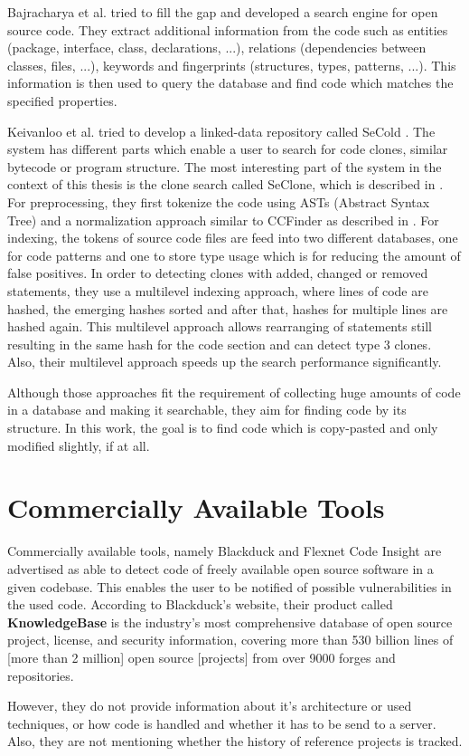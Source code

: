 Bajracharya et al. tried to fill the gap and developed a search engine for open source code.
They extract additional information from the code such as entities (package, interface, class, declarations, ...), relations (dependencies between classes, files, ...), keywords and fingerprints (structures, types, patterns, ...).
This information is then used to query the database and find code which matches the specified properties.

Keivanloo et al. tried to develop a linked-data repository called SeCold \cite{keivanloo2012leveraging,keivanloo2011internet,keivanloo2011seclone,keivanloo2010semantic}.
The system has different parts which enable a user to search for code clones, similar bytecode or program structure.
The most interesting part of the system in the context of this thesis is the clone search called SeClone, which is described in \cite{keivanloo2011internet,keivanloo2011seclone}.
For preprocessing, they first tokenize the code using ASTs (Abstract Syntax Tree) and a normalization approach similar to CCFinder as described in \cite{kamiya2002ccfinder}.
For indexing, the tokens of source code files are feed into two different databases, one for code patterns and one to store type usage which is for reducing the amount of false positives.
In order to detecting clones with added, changed or removed statements, they use a multilevel indexing approach, where lines of code are hashed, the emerging hashes sorted and after that, hashes for multiple lines are hashed again.
This multilevel approach allows rearranging of statements still resulting in the same hash for the code section and can detect type 3 clones.
Also, their multilevel approach speeds up the search performance significantly.

Although those approaches fit the requirement of collecting huge amounts of code in a database and making it searchable, they aim for finding code by its structure.
In this work, the goal is to find code which is copy-pasted and only modified slightly, if at all.

\section{Commercially Available Tools}
Commercially available tools, namely Blackduck and Flexnet Code Insight are advertised as able to detect code of freely available open source software in a given codebase.
This enables the user to be notified of possible vulnerabilities in the used code.
According to Blackduck's website, their product called \textbf{KnowledgeBase} \glqq is the industry’s most comprehensive database of open source project, license, and security information, covering more than 530 billion lines of [more than 2 million] open source [projects] from over 9000 forges and repositories\grqq \cite{blackduck}.

However, they do not provide information about it's architecture or used techniques, or how code is handled and whether it has to be send to a server.
Also, they are not mentioning whether the history of reference projects is tracked.